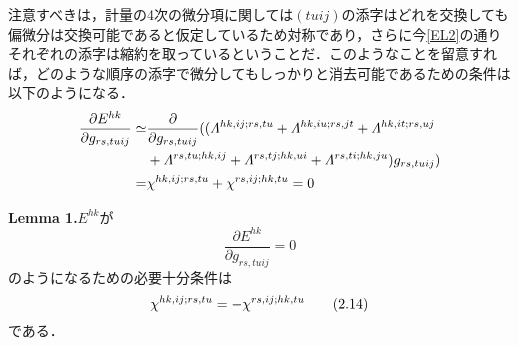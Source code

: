 \documentclass[main]{subfiles}
\begin{document}
注意すべきは，計量の4次の微分項に関しては\((tuij)\)の添字はどれを交換しても偏微分は交換可能であると仮定しているため対称であり，さらに今\eqref{EL2}の通りそれぞれの添字は縮約を取っているということだ．このようなことを留意すれば，どのような順序の添字で微分してもしっかりと消去可能であるための条件は以下のようになる．
\begin{align*}
    \dfrac{\partial E^{hk}}{\partial g_{rs,tuij} }
    \simeq & \dfrac{\partial }{\partial g_{rs,tuij}  }
    (( \varLambda^{hk,ij;rs,tu} + \varLambda^{hk,iu;rs,jt} + \varLambda^{hk,it;rs,uj} \\
    & +\varLambda^{rs,tu;hk,ij} + \varLambda^{rs,tj;hk,ui} + \varLambda^{rs,ti;hk,ju}) g_{rs,tuij}) \\
    = & \chi^{hk,ij;rs,tu}+\chi^{rs,ij;hk,tu}=0
\end{align*}

\textbf{Lemma 1.}\:\(E^{hk}\)が
\begin{equation*}
    \dfrac{\partial E^{hk}}{\partial g_{rs,tuij} } = 0
\end{equation*}
のようになるための必要十分条件は
\begin{equation*}
    \chi^{hk,ij;rs,tu}= -\chi^{rs,ij;hk,tu}
    \tag{2.14} \label{lemma1}
\end{equation*}
である．
\end{document}
